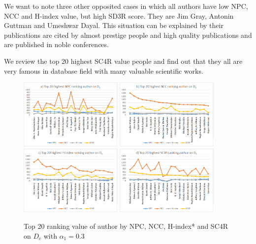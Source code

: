 \documentclass[10pt,leqno,twoside]{article}
\begin{document}
We want to note three other opposited cases in which all authors have low NPC, NCC and H-index value, but high SD3R score. They are Jim Gray, Antonin Guttman and Umeshwar Dayal. This situation can be explained by their publications are cited by almost prestige people and high quality publications and are published in noble conferences.

We review the top 20 highest SC4R value people and find out that they all are very famous in database field with many valuable scientific works.

\begin{figure} %
	\caption{Top 20 ranking value of author by NPC, NCC, H-index* and SC4R on $D_c$ with $\alpha_1=0.3$}
	\label{Fig:Top20AuthorDc}
    \centering
    \includegraphics[width=0.45\textwidth]{DCt20NPCa}
    \includegraphics[width=0.45\textwidth]{DCt20NCCa}
    \includegraphics[width=0.45\textwidth]{DCt20Hindexa}
    \includegraphics[width=0.45\textwidth]{DCt20SC4Ra}
\end{figure}
\end{document}
